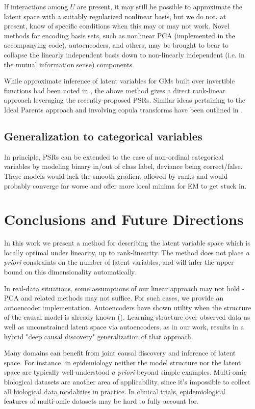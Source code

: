 \documentclass[letterpaper]{article}
\begin{document}
If interactions among $U$ are present, it may still be possible to approximate the latent space with a suitably regularized nonlinear basis, but we do not, at present, know of specific conditions when this may or may not work.  Novel methods for encoding basis sets, such as nonlinear PCA (implemented in the accompanying code), autoencoders, and others, may be brought to bear to collapse the linearly independent basis down to non-linearly independent (i.e. in the mutual information sense) components.

While approximate inference of latent variables for GMs built over invertible functions had been noted in \cite{elidan_ideal_2007}, the above method gives a direct rank-linear approach leveraging the recently-proposed PSRs.  Similar ideas pertaining to the Ideal Parents approach and involving copula transforms have been outlined in \cite{tenzer_generalized_2016}.

\subsection{Generalization to categorical variables}
In principle, PSRs can be extended to the case of non-ordinal categorical variables by modeling binary in/out of class label, deviance being correct/false.  These models would lack the smooth gradient allowed by ranks and would probably converge far worse and offer more local minima for EM to get stuck in.  

\section{Conclusions and Future Directions}
In this work we present a method for describing the latent variable space which is locally optimal under linearity, up to rank-linearity.  The method does not place \textit{a priori} constraints on the number of latent variables, and will infer the upper bound on this dimensionality automatically.  

In real-data situations, some assumptions of our linear approach may not hold - PCA and related methods may not suffice.  For such cases, we provide an autoencoder implementation.  Autoencoders have shown utility when the structure of the causal model is already known (\cite{louizos_causal_2017}).  Learning structure over observed data as well as unconstrained latent space via autoencoders, as in our work, results in a hybrid "deep causal discovery" generalization of that approach.  

Many domains can benefit from joint causal discovery and inference of latent space.  For instance, in epidemiology neither the model structure nor the latent space are typically well-understood \textit{a priori} beyond simple examples.  Multi-omic biological datasets are another area of applicability, since it's impossible to collect all biological data modalities in practice.  In clinical trials, epidemiological features of multi-omic datasets may be hard to fully account for.  
\end{document}

